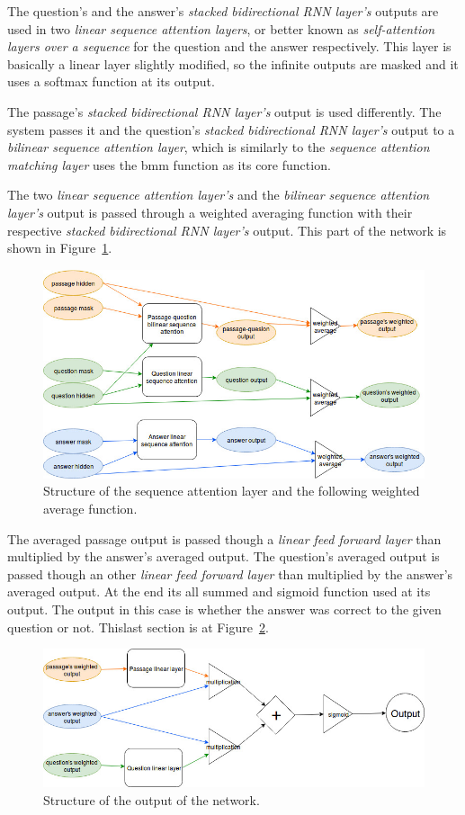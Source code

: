 The question's and the answer's \textit{stacked bidirectional RNN layer's} outputs are used in two \textit{linear sequence attention layers}, or better known as \textit{self-attention layers over a sequence} for the question and the answer respectively. This layer is basically a linear layer slightly modified, so the infinite outputs are masked and it uses a softmax function at its output.

The passage's \textit{stacked bidirectional RNN layer's} output is used differently. The system passes it and the question's \textit{stacked bidirectional RNN layer's} output to a \textit{bilinear sequence attention layer}, which is similarly to the \textit{sequence attention matching layer} uses the bmm function as its core function.

The two \textit{linear sequence attention layer's} and the \textit{bilinear sequence attention layer's} output is passed through a weighted averaging function with their respective \textit{stacked bidirectional RNN layer's} output. This part of the network is shown in Figure~\ref{fig:sequence_attention}.
\begin{figure}[h]
	\centering
	\includegraphics[scale=0.5]{TriAN_sequence_attention.jpg}
	\caption{Structure of the sequence attention layer and the following weighted average function.}
	\label{fig:sequence_attention}
\end{figure}
The averaged passage output is passed though a \textit{linear feed forward layer} than multiplied by the answer's averaged output. The question's averaged output is passed though an other \textit{linear feed forward layer} than multiplied by the answer's averaged output. At the end its all summed and sigmoid function used at its output. The output in this case is whether the answer was correct to the given question or not. Thislast section is at Figure~\ref{fig:output}.
\begin{figure}[h]
	\centering
	\includegraphics[scale=0.5]{TriAN_output.jpg}
	\caption{Structure of the output of the network.}
	\label{fig:output}
\end{figure}